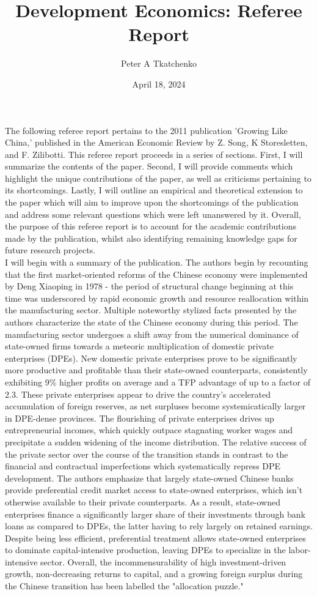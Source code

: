 \documentclass{article}
\title{Development Economics: Referee Report}
\author{Peter A Tkatchenko}
\date{April 18, 2024}
\begin{document}
\maketitle
The following referee report pertains to the 2011
publication 'Growing Like China,' published in the American
Economic Review by Z. Song, K Storesletten, and F. Zilibotti.
This referee report proceeds in a series of sections. First,
I will summarize the contents of the paper. Second, I will 
provide comments which highlight the unique contributions
of the paper, as well as criticisms pertaining to its shortcomings.
Lastly, I will outline an empirical and theoretical extension
to the paper which will aim to improve upon the shortcomings
of the publication and address some relevant questions which were left
unanswered by it. Overall, the purpose of this referee report 
is to account for the academic contributions made by the publication,
whilst also identifying remaining knowledge gaps for future research projects.
\\

I will begin with a summary of the publication. The authors begin by 
recounting that the first market-oriented reforms of the Chinese economy
were implemented by Deng Xiaoping in 1978 - the period of structural change beginning 
at this time was underscored by rapid economic growth and resource reallocation within 
the manufacturing sector. Multiple noteworthy stylized facts presented by the authors characterize the 
state of the Chinese economy during this period. The manufacturing sector
undergoes a shift away from the numerical dominance of state-owned firms towards
a meteoric multiplication of domestic private enterprises (DPEs). New domestic private enterprises 
prove to be significantly more productive and profitable than their state-owned counterparts, 
consistently exhibiting 9\% higher profits on average and a TFP advantage of up to a factor of 2.3.
These private enterprises appear to drive the country's accelerated accumulation of foreign reserves, 
as net surpluses become systemicatically larger in DPE-dense provinces. The flourishing 
of private enterprises drives up entrepreneurial incomes, which quickly outpace stagnating worker wages and 
precipitate a sudden widening of the income distribution. The relative success of the private sector 
over the course of the transition stands in contrast to the financial and contractual imperfections 
which systematically repress DPE development. The authors emphasize that largely state-owned Chinese banks provide preferential 
credit market access to state-owned enterprises, which isn't otherwise available to their 
private counterparts. As a result, state-owned enterprises finance a significantly larger share of their investments
through bank loans as compared to DPEs, the latter having to rely largely on retained earnings. Despite being less efficient,
preferential treatment allows state-owned enterprises to dominate capital-intensive production, leaving DPEs to specialize
in the labor-intensive sector. Overall, the incommensurability of high investment-driven growth, non-decreasing returns to capital,
and a growing foreign surplus during the Chinese transition has been labelled the "allocation puzzle." 
\end{document}
